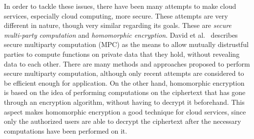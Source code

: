 In order to tackle these issues, there have been many attempts to make cloud services, especially cloud computing, more secure. These attempts are very different in nature, though very similar regarding its goals. These are \emph{secure multi-party computation} and \emph{homomorphic encryption}. David et al.\ \cite{cryptoeprint:2015:135} describes secure multiparty computation (MPC) as the means to allow mutually distrustful parties to compute functions on private data that they hold, without revealing data to each other. There are many methods and approaches proposed to perform secure multiparty computation, although only recent attempts are considered to be efficient enough for application. On the other hand, homomorphic encryption is based on the idea of performing computations on the ciphertext that has gone through an encryption algorithm, without having to decrypt it beforehand. This aspect makes homomorphic encryption a good technique for cloud services, since only the authorized users are able to decrypt the ciphertext after the necessary computations have been performed on it.


\clearpage
